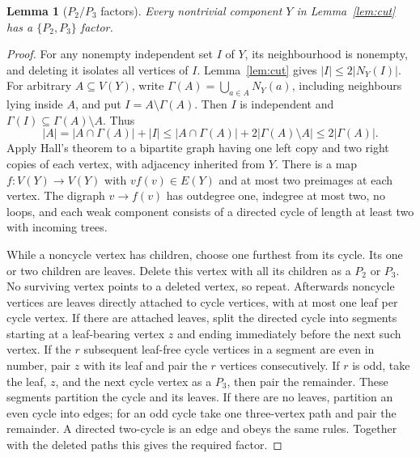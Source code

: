 \documentclass[11pt]{article}
\newtheorem{lemma}{Lemma}
\theoremstyle{remark}\newtheorem{remark}[lemma]{Remark}
\begin{document}
\begin{lemma}[$P_2/P_3$ factors]\label{lem:path-factor}
Every nontrivial component $Y$ in Lemma~\ref{lem:cut} has a
$\{P_2,P_3\}$ factor.
\end{lemma}
\begin{proof}
For any nonempty independent set $I$ of $Y$, its neighbourhood is
nonempty, and deleting it isolates all vertices of $I$.
Lemma~\ref{lem:cut} gives $|I|\le2|N_Y(I)|$.
For arbitrary $A\subseteq V(Y)$, write
$\Gamma(A)=\bigcup_{a\in A}N_Y(a)$, including neighbours lying
inside $A$, and put $I=A\setminus\Gamma(A)$. Then $I$ is independent
and $\Gamma(I)\subseteq\Gamma(A)\setminus A$. Thus
\[
 |A|=|A\cap\Gamma(A)|+|I|
 \le |A\cap\Gamma(A)|+2|\Gamma(A)\setminus A|
 \le2|\Gamma(A)|.
\]
Apply Hall's theorem to a bipartite graph having one left copy and
two right copies of each vertex, with adjacency inherited from $Y$.
There is a map $f:V(Y)\to V(Y)$ with $vf(v)\in E(Y)$ and at most
two preimages at each vertex. The digraph $v\to f(v)$ has outdegree
one, indegree at most two, no loops, and each weak component consists
of a directed cycle of length at least two with incoming trees.

While a noncycle vertex has children, choose one furthest from its
cycle. Its one or two children are leaves. Delete this vertex with
all its children as a $P_2$ or $P_3$. No surviving vertex points to a
deleted vertex, so repeat. Afterwards noncycle vertices are leaves
directly attached to cycle vertices, with at most one leaf per cycle
vertex. If there are attached leaves, split the directed cycle into
segments starting at a leaf-bearing vertex $z$ and ending immediately
before the next such vertex. If the $r$ subsequent leaf-free cycle
vertices in a segment are even in number, pair $z$ with its leaf and
pair the $r$ vertices consecutively. If $r$ is odd, take the leaf,
$z$, and the next cycle vertex as a $P_3$, then pair the remainder.
These segments partition the cycle and its leaves. If there are no
leaves, partition an even cycle into edges; for an odd cycle take one
three-vertex path and pair the remainder. A directed two-cycle is an
edge and obeys the same rules. Together with the deleted paths this
gives the required factor.
\end{proof}
\end{document}
